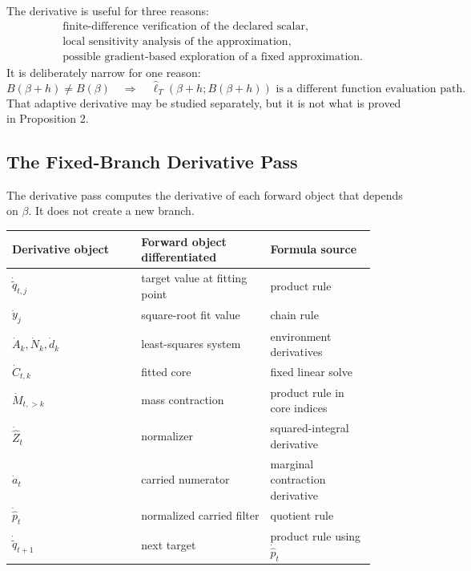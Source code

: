 \documentclass[11pt]{article}
\numberwithin{equation}{section}
\begin{document}
The derivative is useful for three reasons:
\begin{equation}
\begin{aligned}
&\text{finite-difference verification of the declared scalar},\\
&\text{local sensitivity analysis of the approximation},\\
&\text{possible gradient-based exploration of a fixed approximation}.
\end{aligned}
    \label{eq:p25-gradteach-10}
\end{equation}
It is deliberately narrow for one reason:
\begin{equation}
    B(\beta+h)\ne B(\beta)
    \quad\Rightarrow\quad
    \widehat\ell_T(\beta+h;B(\beta+h))
    \text{ is a different function evaluation path.}
    \label{eq:p25-gradteach-11}
\end{equation}
That adaptive derivative may be studied separately, but it is not what is
proved in Proposition 2.

\subsection{The Fixed-Branch Derivative Pass}

The derivative pass computes the derivative of each forward object that depends
on \(\beta\).  It does not create a new branch.

\begin{center}
\begin{tabular}{p{0.32\linewidth}p{0.32\linewidth}p{0.26\linewidth}}
\toprule
Derivative object & Forward object differentiated & Formula source\\
\midrule
\(\dot{\widetilde q}_{t,j}\) & target value at fitting point & product rule\\
\(\dot y_j\) & square-root fit value & chain rule\\
\(\dot A_k,\dot N_k,\dot d_k\) & least-squares system & environment derivatives\\
\(\dot C_{t,k}\) & fitted core & fixed linear solve\\
\(\dot M_{t,>k}\) & mass contraction & product rule in core indices\\
\(\dot{\widehat Z}_t\) & normalizer & squared-integral derivative\\
\(\dot a_t\) & carried numerator & marginal contraction derivative\\
\(\dot{\widehat p}_t\) & normalized carried filter & quotient rule\\
\(\dot{\widetilde q}_{t+1}\) & next target & product rule using \(\dot{\widehat p}_t\)\\
\bottomrule
\end{tabular}
\end{center}
\end{document}
